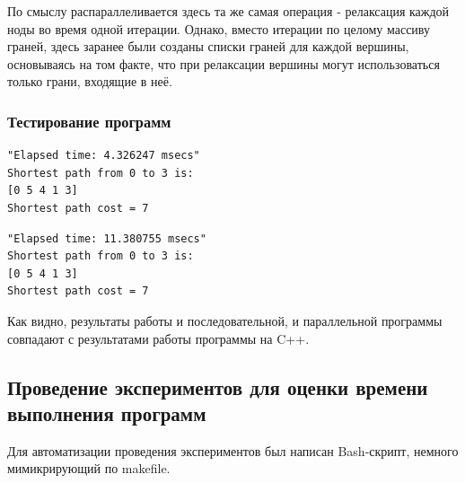 \documentclass[utf8x, 14pt]{article}
\begin{document}
По смыслу распараллеливается здесь та же самая операция - релаксация каждой ноды во время одной итерации. Однако, вместо итерации по целому массиву граней, здесь заранее были созданы списки граней для каждой вершины, основываясь на том факте, что при релаксации вершины могут использоваться только грани, входящие в неё.

\subsubsection{Тестирование программ}

\begin{lstlisting}[frame=single, caption="Результат работы последовательной программы", captionpos=b]
"Elapsed time: 4.326247 msecs"
Shortest path from 0 to 3 is:
[0 5 4 1 3]
Shortest path cost = 7
\end{lstlisting}

\begin{lstlisting}[frame=single, caption="Результат работы параллельной программы", captionpos=b]
"Elapsed time: 11.380755 msecs"
Shortest path from 0 to 3 is:
[0 5 4 1 3]
Shortest path cost = 7
\end{lstlisting}

Как видно, результаты работы и последовательной, и параллельной программы совпадают с результатами работы программы на C++.
 
 
\subsection{Проведение экспериментов для оценки времени выполнения программ}

Для автоматизации проведения экспериментов был написан Bash-скрипт, немного мимикрирующий по makefile.
\end{document}
